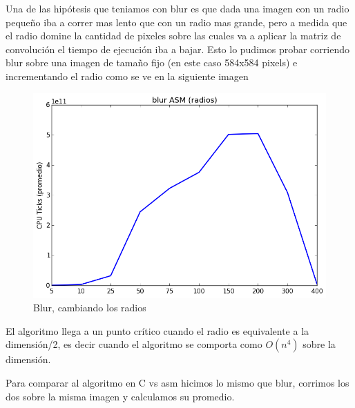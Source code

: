 \documentclass[a4paper]{article}
\begin{document}
\noindent Una de las hipótesis que teniamos con blur es que dada una imagen con un radio pequeño iba a correr mas lento que con un radio mas grande, pero a medida que el radio domine la cantidad de pixeles sobre las cuales va a aplicar la matriz de convolución el tiempo de ejecución iba a bajar. Esto lo pudimos probar corriendo blur sobre una imagen de tamaño fijo (en este caso 584x584 pixels) e incrementando el radio como se ve en la siguiente imagen

\begin{figure}[h]
	\includegraphics[scale=0.62]{imagenes/test_radio_size_ASM.png}
	\caption{Blur, cambiando los radios}
\end{figure}

El algoritmo llega a un punto crítico cuando el radio es equivalente a la dimensión/2, es decir cuando el algoritmo se comporta como $O(n^4)$ sobre la dimensión.


\newpage 

Para comparar al algoritmo en C vs asm hicimos lo mismo que blur, corrimos los dos sobre la misma imagen y calculamos su promedio.
\end{document}
